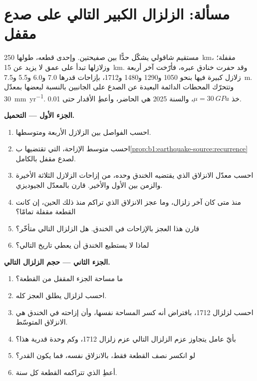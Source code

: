 \section{مسألة: الزلزال الكبير التالي على صدع مقفل}

\begin{problem}
\label{pb:b1:earthquake-source:1}
 مستقيم شاقولي يشكّل حدًّا بين صفيحتين. وإحدى قطعه، طولها \qty{250}{km}، مقفلة؛ وزلازلها تبدأ على عمق لا يزيد عن \qty{15}{km}. وقد حفرت خنادق عبره، فأرّخت آخر أربعة زلازل كبيرة فيها بنحو 1050 و\num{1290} و\num{1480} و\num{1712}، بإزاحات قدرها \num{7.0} و\num{6.0} و\num{5.5} و\qty{7.5}{m}. وتتحرّك المحطات الدائمة البعيدة عن الصدع على الجانبين بالنسبة لبعضها بمعدّل \qty{30}{mm.yr^{-1}}. خذ $\mu =
\qty{30}{GPa}$، والسنة 2025 هي الحاضر، وأعطِ الأقدار حتى 0.01.

\medskip
\noindent\textbf{الجزء الأول --- التحميل.}
\begin{enumerate}
  \item احسب الفواصل بين الزلازل الأربعة ومتوسطها.
  \item احسب متوسط الإزاحة،  التي تقتضيها ب\cref{prop:b1:earthquake-source:recurrence} لصدع مقفل بالكامل.
  \item احسب معدّل الانزلاق الذي يقتضيه الخندق وحده، من إزاحات الزلازل الثلاثة الأخيرة والزمن بين الأول والأخير. قارن بالمعدّل الجيوديزي.
  \item منذ متى كان آخر زلزال، وما عجز الانزلاق الذي تراكم منذ ذلك الحين، إن كانت القطعة مقفلة تمامًا؟
  \item قارن هذا العجز بالإزاحات في الخندق. هل الزلزال التالي متأخّر؟
  \item لماذا لا يستطيع الخندق أن يعطي تاريخ التالي؟
\end{enumerate}

\medskip
\noindent\textbf{الجزء الثاني --- حجم الزلزال التالي.}
\begin{enumerate}[resume]
  \item ما مساحة الجزء المقفل من القطعة؟
  \item احسب  لزلزال يطلق العجز كله.
  \item احسب  لزلزال 1712، بافتراض أنه كسر المساحة نفسها، وأن إزاحته في الخندق هي الانزلاق المتوسّط.
  \item بأيّ عامل يتجاوز عزم الزلزال التالي عزم زلزال 1712، وكم وحدة قدرية هذا؟
  \item لو انكسر نصف القطعة فقط، بالانزلاق نفسه، فما يكون القدر؟
  \item أعطِ  الذي تتراكمه القطعة كل سنة.
\end{enumerate}


\end{problem}
